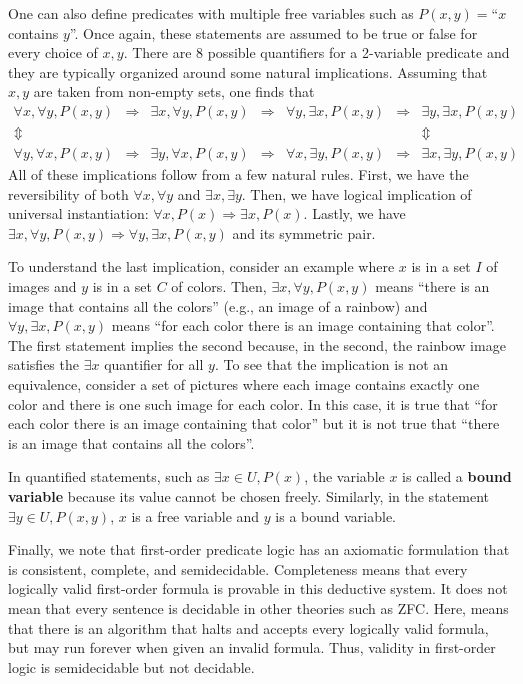 One can also define predicates with multiple free variables such as $P(x,y)=$``$x$ contains $y$''.
Once again, these statements are assumed to be true or false for every choice of $x,y$.
There are 8 possible quantifiers for a 2-variable predicate and they are typically organized around some natural implications.
Assuming that $x,y$ are taken from non-empty sets, one finds that
\[ \begin{array}{ccccccc}
  \forall x, \forall y, P(x,y) & \Rightarrow & \exists x, \forall y, P(x,y) & \Rightarrow & \forall y, \exists x, P(x,y) & \Rightarrow & \exists y, \exists x, P(x,y) \\
  \Updownarrow &&&&&& \Updownarrow \\
  \forall y, \forall x, P(x,y) & \Rightarrow & \exists y, \forall x, P(x,y) & \Rightarrow & \forall x, \exists y, P(x,y) & \Rightarrow & \exists x, \exists y, P(x,y)
  \end{array}
\]
All of these implications follow from a few natural rules.
First, we have the reversibility of both $\forall x, \forall y$ and $\exists x, \exists y$.
Then, we have logical implication of universal instantiation: $\forall x, P(x) \Rightarrow \exists x, P(x)$.
Lastly, we have $\exists x, \forall y, P(x,y) \Rightarrow \forall y, \exists x, P(x,y)$ and its symmetric pair.

To understand the last implication, consider an example where $x$ is in a set $I$ of images and $y$ is in a set $C$ of colors.
Then, $\exists x, \forall y, P(x,y)$ means ``there is an image that contains all the colors'' (e.g., an image of a rainbow) and $\forall y, \exists x, P(x,y)$ means ``for each color there is an image containing that color''.
The first statement implies the second because, in the second, the rainbow image satisfies the $\exists x$ quantifier for all $y$.
To see that the implication is not an equivalence, consider a set of pictures where each image contains exactly one color and there is one such image for each color.
In this case, it is true that ``for each color there is an image containing that color'' but it is not true that ``there is an image that contains all the colors''.

In quantified statements, such as $\exists x\in U, P(x)$, the variable $x$ is called a \textbf{bound variable} because its value cannot be chosen freely.
Similarly, in the statement $\exists y \in U, P(x,y)$, $x$ is a free variable and $y$ is a bound variable.

Finally, we note that first-order predicate logic has an axiomatic formulation that is consistent, complete, and semidecidable.
Completeness means that every logically valid first-order formula is provable in this deductive system.
It does not mean that every sentence is decidable in other theories such as ZFC.
Here,  means that there is an algorithm that halts and accepts every logically valid formula, but may run forever when given an invalid formula.
Thus, validity in first-order logic is semidecidable but not decidable.

